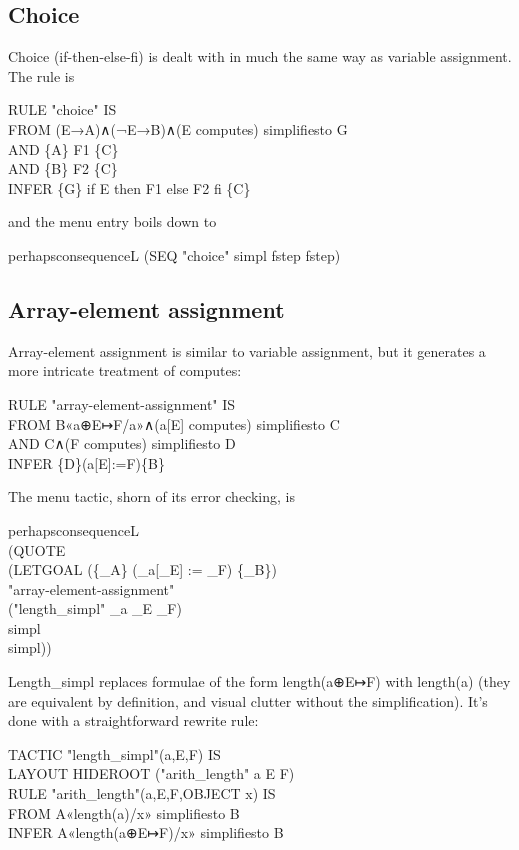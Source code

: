 \subsection{Choice}

Choice (if-then-else-fi) is dealt with in much the same way as variable assignment. The rule is
\begin{japeish}
RULE "choice" IS \\
\tab FROM (E→A)∧(¬E→B)∧(E computes) simplifiesto G  \\
\tab AND \{A\} F1 \{C\}  \\
\tab AND \{B\} F2 \{C\}  \\
\tab INFER \{G\} if E then F1 else F2 fi \{C\}
\end{japeish}
and the menu entry boils down to
\begin{japeish}
perhapsconsequenceL (SEQ "choice" simpl fstep fstep)
\end{japeish}

\subsection{Array-element assignment}

Array-element assignment is similar to variable assignment, but it generates a more intricate treatment of computes:
\begin{japeish}
RULE "array-element-assignment" IS  \\
\tab FROM B«a⊕E↦F/a»∧(a[E] computes) simplifiesto C  \\
\tab AND C∧(F computes) simplifiesto D \\
\tab INFER \{D\}(a[E]:=F)\{B\}
\end{japeish}
The menu tactic, shorn of its error checking, is
\begin{japeish}
perhapsconsequenceL \\
\tab (QUOTE \\
\tab \tab (LETGOAL (\{\_A\} (\_a[\_E] := \_F) \{\_B\}) \\
\tab \tab \tab "array-element-assignment" \\
\tab \tab \tab ("length\_simpl" \_a \_E \_F) \\
\tab \tab \tab simpl \\
\tab \tab \tab simpl))
\end{japeish}
Length\_simpl replaces formulae of the form length(a⊕E↦F) with length(a) (they are equivalent by definition, and visual clutter without the simplification). It's done with a straightforward rewrite rule:
\begin{japeish}
TACTIC "length\_simpl"(a,E,F) IS \\
\tab LAYOUT HIDEROOT ("arith\_length" a E F) \\
RULE "arith\_length"(a,E,F,OBJECT x) IS \\
\tab FROM A«length(a)/x» simplifiesto B \\
\tab INFER A«length(a⊕E↦F)/x» simplifiesto B
\end{japeish}

